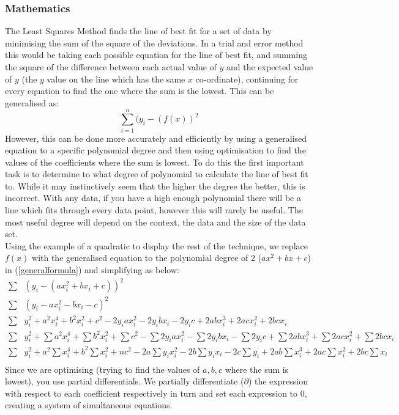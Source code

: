 \documentclass{article}
\begin{document}
\subsubsection{Mathematics}
The Least Squares Method finds the line of best fit for a set of data by minimising the sum of the square of the deviations. In a trial and error method this would be taking each possible equation for the line of best fit, and summing the square of the difference between each actual value of $y$ and the expected value of $y$ (the $y$ value on the line which has the same $x$ co-ordinate), continuing for every equation to find the one where the sum is the lowest. This can be generalised as:
\begin{equation} \label{generalformula}
    \sum_{i=1}^ n (y_i - (f(x))^2
\end{equation}
However, this can be done more accurately and efficiently by using a generalised equation to a specific polynomial degree and then using optimisation to find the values of the coefficients where the sum is lowest. To do this the first important task is to determine to what degree of polynomial to calculate the line of best fit to. While it may instinctively seem that the higher the degree the better, this is incorrect. With any data, if you have a high enough polynomial there will be a line which fits through every data point, however this will rarely be useful. The most useful degree will depend on the context, the data and the size of the data set. \\
Using the example of a quadratic to display the rest of the technique, we replace $f(x)$ with the generalised equation to the polynomial degree of 2 ($ax^2 + bx + c$) in (\ref{generalformula}) and simplifying as below:
\begin{align*}
    \sum& (y_i - (ax_i^2 + bx_i + c))^2 \\
    \sum& (y_i - ax_i^2 - bx_i - c)^2 \\
    \sum& y_i^2 + a^2x_i^4 + b^2x_i^2 + c^2 - 2y_iax_i^2 - 2y_i bx_i - 2y_i c +  2abx_i^3 + 2acx_i^2 + 2bcx_i \\
    \sum& y_i^2 + \sum a^2x_i^4 +\sum b^2x_i^2 +\sum c^2 -\sum 2y_iax_i^2 -\sum 2y_i bx_i -\sum 2y_i c +\sum  2abx_i^3 +\sum 2acx_i^2 +\sum 2bcx_i \\
    \sum& y_i^2 + a^2\sum x_i^4 +b^2\sum x_i^2 + nc^2 - 2a\sum y_ix_i^2 -2b\sum y_i x_i - 2c\sum y_i + 2ab\sum  x_i^3 + 2ac\sum x_i^2 + 2bc\sum x_i \\
\end{align*}
Since we are optimising (trying to find the values of $a,b,c$ where the sum is lowest), you use partial differentials. We partially differentiate ($\partial $) the expression with respect to each coefficient respectively in turn and set each expression to $0$, creating a system of simultaneous equations.
\end{document}
